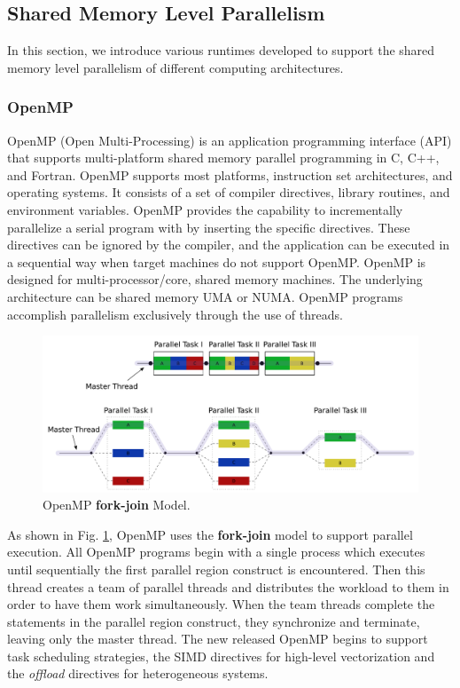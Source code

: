 \subsection{Shared Memory Level Parallelism}

In this section, we introduce various runtimes developed to support the shared memory level parallelism of different computing architectures. 

\subsubsection{OpenMP}

OpenMP (Open Multi-Processing) \cite{dagum1998openmp} is an application programming interface (API) that supports multi-platform shared memory parallel programming in C, C++, and Fortran. OpenMP supports most platforms, instruction set architectures, and operating systems. It consists of a set of compiler directives, library routines, and environment variables. OpenMP provides the capability to incrementally parallelize a serial program with by inserting the specific directives. These directives can be ignored by the compiler, and the application can be executed in a sequential way when target machines do not support OpenMP. OpenMP is designed for multi-processor/core, shared memory machines. The underlying architecture can be shared memory UMA or NUMA. OpenMP programs accomplish parallelism exclusively through the use of threads.

\begin{figure}[htbp]
	\centering
	\includegraphics[width=6.3in]{fig/Fork_join.pdf}
	\caption{OpenMP \textbf{fork-join} Model.}
	\label{openmp_fork_join}
\end{figure}

As shown in Fig. \ref{openmp_fork_join}, OpenMP uses the \textbf{fork-join} model to support parallel execution. All OpenMP programs begin with a single process which executes until sequentially the first parallel region construct is encountered.  Then this thread creates a team of parallel threads and distributes the workload to them in order to have them work simultaneously. When the team threads complete the statements in the parallel region construct, they synchronize and terminate, leaving only the master thread. The new released OpenMP begins to support task scheduling strategies, the SIMD directives for high-level vectorization and the \textit{offload} directives for heterogeneous systems.

